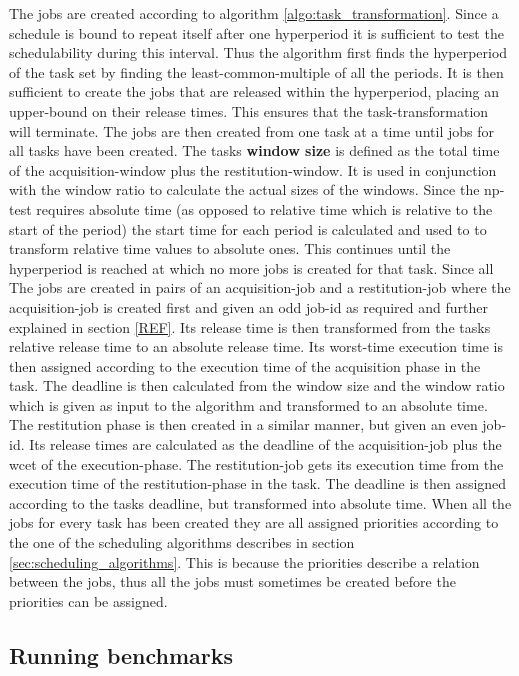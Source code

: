 \documentclass{kththesis}
\begin{document}
The jobs are created according to algorithm \ref{algo:task_transformation}. Since a schedule is
bound to repeat itself after one hyperperiod it is sufficient to test the schedulability during this
interval. Thus the algorithm first finds the hyperperiod of the task set by finding the
least-common-multiple of all the periods. It is then sufficient to create the jobs that are released
within the hyperperiod, placing an upper-bound on their release times. This ensures that the
task-transformation will terminate. The jobs are then created from one task at a time until jobs for
all tasks have been created. The tasks \textbf{window size} is defined as the total time of the
acquisition-window plus the restitution-window. It is used in conjunction with the window ratio to
calculate the actual sizes of the windows. Since the \acrshort{np}-test requires absolute time
(as opposed to relative time which is relative to the start of the period) the start time for each
period is calculated and used to to transform relative time values to absolute ones. This continues
until the hyperperiod is reached at which no more jobs is created for that task. Since all The jobs
are created in pairs of an acquisition-job and a restitution-job where the acquisition-job is
created first and given an odd job-id as required and further explained in section \ref{REF}. Its
release time is then transformed from the tasks relative release time to an absolute release time.
Its worst-time execution time is then assigned according to the execution time of the acquisition
phase in the task. The deadline is then calculated from the window size and the window ratio which
is given as input to the algorithm and transformed to an absolute time. The restitution phase is
then created in a similar manner, but given an even job-id. Its release times are calculated as the
deadline of the acquisition-job plus the \acrshort{wcet} of the execution-phase. The restitution-job
gets its execution time from the execution time of the restitution-phase in the task. The deadline
is then assigned according to the tasks deadline, but transformed into absolute time. When all the
jobs for every task has been created they are all assigned priorities according to the one of the
scheduling algorithms describes in section \ref{sec:scheduling_algorithms}. This is because the
priorities describe a relation between the jobs, thus all the jobs must sometimes be created before
the priorities can be assigned. 


\subsection{Running benchmarks}
\end{document}
